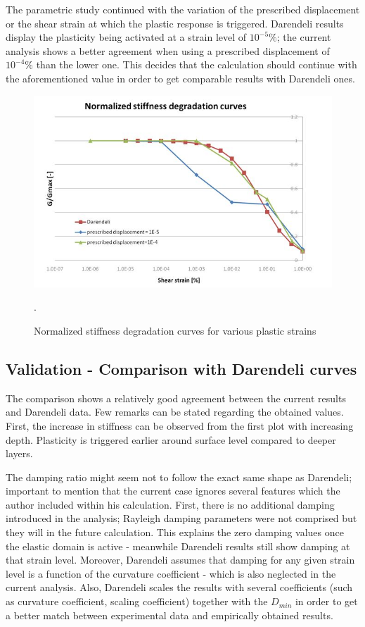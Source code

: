 \documentclass[10pt,a4paper]{report}
\begin{document}
The parametric study continued with the variation of the prescribed displacement or the shear strain at which the plastic response is triggered. Darendeli results display the plasticity being activated at a strain level of $10^{-5}\%$; the current analysis shows a better agreement when using a prescribed displacement of $10^{-4}\%$ than the lower one. This decides that the calculation should continue with the aforementioned value in order to get comparable results with Darendeli ones.

\begin{figure}[h!]
	\centering
	\includegraphics[width=0.7\linewidth]{"ggmax"}
	\caption{Normalized stiffness degradation curves for various plastic strains}
	\label{ggmax}.
\end{figure}

\subsection{Validation - Comparison with Darendeli curves}
The comparison shows a relatively good agreement between the current results and Darendeli data. Few remarks can be stated regarding the obtained values. First, the increase in stiffness can be observed from the first plot with increasing depth. Plasticity is triggered earlier around surface level compared to deeper layers. 

The damping ratio might seem not to follow the exact same shape as Darendeli; important to mention that the current case ignores several features which the author included within his calculation. First, there is no additional damping introduced in the analysis; Rayleigh damping parameters were not comprised but they will in the future calculation. This explains the zero damping values once the elastic domain is active - meanwhile Darendeli results still show damping at that strain level. Moreover, Darendeli assumes that damping for any given strain level is a function of the curvature coefficient - which is also neglected in the current analysis. Also, Darendeli scales the results with several coefficients (such as curvature coefficient, scaling coefficient) together with the $D_{min}$ in order to get a better match between experimental data and empirically obtained results. 
\end{document}
